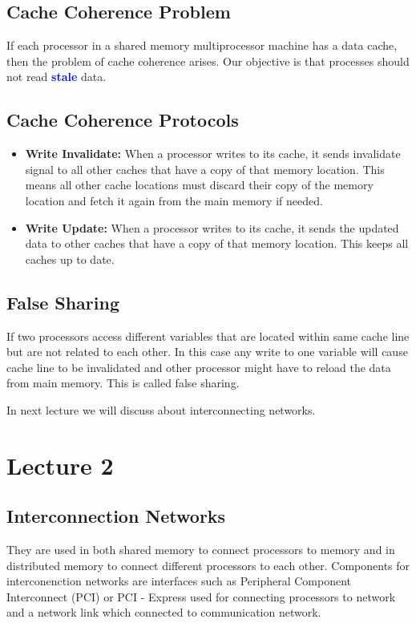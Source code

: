 \documentclass{article}
\begin{document}
\subsection*{Cache Coherence Problem}
If each processor in a shared memory multiprocessor machine has a data cache, then the problem of cache coherence arises. Our objective is that processes should not read \textcolor{blue}{\textbf{stale}} data.

\subsection*{Cache Coherence Protocols}
\begin{itemize}
    \item \textbf{Write Invalidate:} When a processor writes to its cache, it sends invalidate signal to all other caches that have a copy of that memory location. This means all other cache locations must discard their copy of the memory location and fetch it again from the main memory if needed.
    \item \textbf{Write Update:} When a processor writes to its cache, it sends the updated data to other caches that have a copy of that memory location. This keeps all caches up to date.
\end{itemize}

\subsection*{False Sharing}
If two processors access different variables that are located within same cache line but are not related to each other. In this case any write to one variable will cause cache line to be invalidated and other processor might have to reload the data from main memory. This is called false sharing.

In next lecture we will discuss about interconnecting networks.
\newpage

\section*{Lecture 2}
\subsection*{Interconnection Networks}

They are used in both shared memory to connect processors to memory and in distributed memory to connect different processors to each other. Components for interconenction networks are interfaces such as Peripheral Component Interconnect (PCI) or PCI - Express used for connecting processors to network and a network link which connected to communication network.
\end{document}
